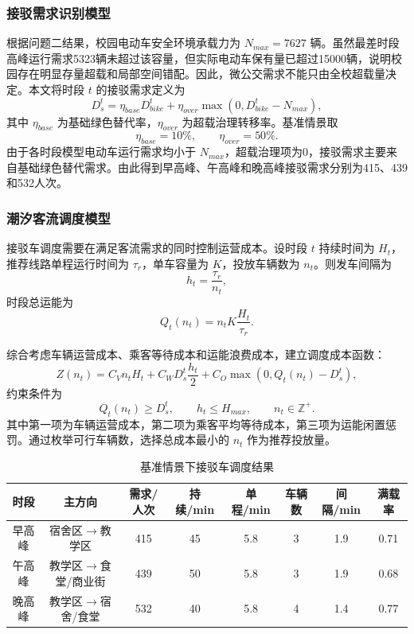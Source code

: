 \documentclass[UTF8,zihao=-4,a4paper]{ctexart}
\begin{document}
\subsubsection{接驳需求识别模型}

根据问题二结果，校园电动车安全环境承载力为 $N_{max}=7627$ 辆。虽然最差时段高峰运行需求5323辆未超过该容量，但实际电动车保有量已超过15000辆，说明校园存在明显存量超载和局部空间错配。因此，微公交需求不能只由全校超载量决定。本文将时段 $t$ 的接驳需求定义为
\begin{equation}
D_s^t=\eta_{base}D_{bike}^t+\eta_{over}\max(0,D_{bike}^t-N_{max}),
\end{equation}
其中 $\eta_{base}$ 为基础绿色替代率，$\eta_{over}$ 为超载治理转移率。基准情景取
\begin{equation}
\eta_{base}=10\%,\qquad \eta_{over}=50\%.
\end{equation}
由于各时段模型电动车运行需求均小于 $N_{max}$，超载治理项为0，接驳需求主要来自基础绿色替代需求。由此得到早高峰、午高峰和晚高峰接驳需求分别为415、439和532人次。

\subsubsection{潮汐客流调度模型}

接驳车调度需要在满足客流需求的同时控制运营成本。设时段 $t$ 持续时间为 $H_t$，推荐线路单程运行时间为 $\tau_r$，单车容量为 $K$，投放车辆数为 $n_t$。则发车间隔为
\begin{equation}
h_t=\frac{\tau_r}{n_t},
\end{equation}
时段总运能为
\begin{equation}
Q_t(n_t)=n_tK\frac{H_t}{\tau_r}.
\end{equation}

综合考虑车辆运营成本、乘客等待成本和运能浪费成本，建立调度成本函数：
\begin{equation}
Z(n_t)=C_Vn_tH_t+C_WD_s^t\frac{h_t}{2}+C_O\max(0,Q_t(n_t)-D_s^t),
\end{equation}
约束条件为
\begin{equation}
Q_t(n_t)\ge D_s^t,\qquad h_t\le H_{max},\qquad n_t\in \mathbb{Z}^{+}.
\end{equation}
其中第一项为车辆运营成本，第二项为乘客平均等待成本，第三项为运能闲置惩罚。通过枚举可行车辆数，选择总成本最小的 $n_t$ 作为推荐投放量。

\begin{table}[H]
\centering
\caption{基准情景下接驳车调度结果}
\label{tab:dispatch_result}
\begin{tabular}{cccccccc}
\toprule
\textbf{时段} & \textbf{主方向} & \textbf{需求/人次} & \textbf{持续/min} & \textbf{单程/min} & \textbf{车辆数} & \textbf{间隔/min} & \textbf{满载率} \\
\midrule
早高峰 & 宿舍区$\rightarrow$教学区 & 415 & 45 & 5.8 & 3 & 1.9 & 0.71 \\
午高峰 & 教学区$\rightarrow$食堂/商业街 & 439 & 50 & 5.8 & 3 & 1.9 & 0.68 \\
晚高峰 & 教学区$\rightarrow$宿舍/食堂 & 532 & 40 & 5.8 & 4 & 1.4 & 0.77 \\
\bottomrule
\end{tabular}
\end{table}
\end{document}
